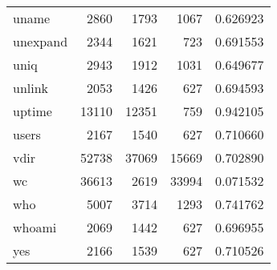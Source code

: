 \begin{tabular}{lrrrr}
uname     &                     2860 &         1793 &          1067 &                 0.626923 \\
unexpand  &                     2344 &         1621 &           723 &                 0.691553 \\
uniq      &                     2943 &         1912 &          1031 &                 0.649677 \\
unlink    &                     2053 &         1426 &           627 &                 0.694593 \\
uptime    &                    13110 &        12351 &           759 &                 0.942105 \\
users     &                     2167 &         1540 &           627 &                 0.710660 \\
vdir      &                    52738 &        37069 &         15669 &                 0.702890 \\
wc        &                    36613 &         2619 &         33994 &                 0.071532 \\
who       &                     5007 &         3714 &          1293 &                 0.741762 \\
whoami    &                     2069 &         1442 &           627 &                 0.696955 \\
yes       &                     2166 &         1539 &           627 &                 0.710526 \\
\bottomrule
\end{tabular}
